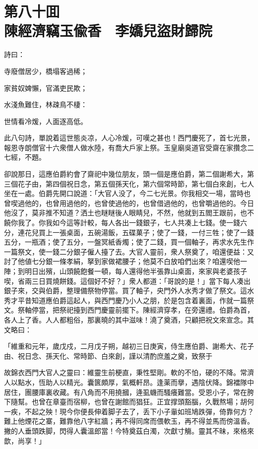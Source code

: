 
\chapter*{第八十囬　\\陳經濟竊玉偸香　李嬌兒盜財歸院}


詩曰：

\begin{myquote}
寺廢僧居少，橋塌客過稀；

家貧奴婢懶，官滿吏民欺；

水淺魚難住，林疎鳥不棲：

世情看冷煖，人面逐高低。
\end{myquote}

此八句詩，單說着這世態炎凉，人心冷煖，可嘆之甚也！西門慶死了，首七光景，報恩寺朗僧官十六衆僧人做水陸，有喬大戶家上祭。玉皇廟吳道官受齋在家攢念二七經，不題。

卻說那日，這應伯爵約會了齋祀中幾位朋友，頭一個是應伯爵，第二個謝希大，第三個花子由，第四個祝日念，第五個孫天化，第六個常時節，第七個白來創，七人坐在一處。伯爵先開口說道：「大官人没了，今二七光景。你我相交一場，當時也曾喫過他的，也曾用過他的，也曾使過他的，也曾借過他的，也曾嚼過他的。今日他沒了，莫非推不知道？洒土也瞇瞇後人眼睛兒，不然，他就到五閻王跟前，也不饒你我了。你我如今這等計較，每人各出一錢銀子，七人共凑上七錢。使一錢六分，連花兒買上一張桌面，五碗湯飯，五碟菓子；使了一錢，一付三牲；使了一錢五分，一瓶酒；使了五分，一盤冥紙香燭；使了二錢，買一個軸子，再求水先生作一篇祭文，使一錢二分銀子僱人擡了去。大官人靈前，衆人祭奠了，咱還便益：又討了他値七分銀一條孝絹，拏到家做裙腰子；他莫不白放咱們出來？咱還喫他一陣；到明日出殯，山頭饒飽餐一頓，每人還得他半張靠山桌面，來家與老婆孩子喫，省兩三日買燒餅錢。這個好不好？」衆人都道：「哥說的是！」當下每人凑出銀子來，交與伯爵，整理備祭物停當。買了軸子，央門外人水秀才做了祭文。這水秀才平昔知道應伯爵這起人，與西門慶乃小人之朋，於是包含着裏面，作就一篇祭文。祭軸停當，把祭祀擡到西門慶靈前擺下。陳經濟穿孝，在旁還禮。伯爵為首，各人上了香。人人都粗俗，那裏曉的其中滋味！澆了奠酒，只顧把祝文來宣念。其文略曰：

\begin{myquote}[\markfont]
「維重和元年，歲戊戍，二月戊子朔，越初三日庚寅，侍生應伯爵、謝希大、花子由、祝日念、孫天化、常時節、白來創，謹以清酌庶羞之奠，致祭于

故錦衣西門大官人之靈曰：維靈生前梗直，秉性堅剛。軟的不怕，硬的不降。常濟人以點水，恆助人以精光。囊篋頗厚，氣概軒昂。逢薬而擧，遇陰伏降。錦襠隊中居住，團腰庫裏收藏。有八角而不用撓摑，逄虱蟣而騷癢難當。受恩小子，常在胯下隨幫。也曾在章臺而宿柳，也曾在謝館而猖狂。正宜撑頭豁腦，久戰熬場；胡何一疾，不起之殃！現今你便長伸着脚子去了，丢下小子軰如班鳩跌彈，倚靠何方？難上他煙花之寨，難靠他八字紅牆；再不得同席而偎軟玉，再不得並馬而傍溫香。撇的人垂頭跌脚，閃得人囊溫郎當！今特奠茲白濁，次獻寸觴。靈其不昧，來格來歆，尚享！」
\end{myquote}

